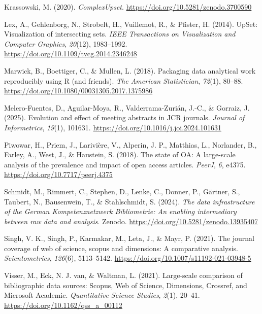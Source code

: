 \documentclass[a4paper,man,floatsintext,longtable,noextraspace,10pt]{apa6}
\newlength{\cslhangindent}
\newenvironment{CSLReferences}[2] %
{\begin{list}{}{%
  \setlength{\itemindent}{0pt}
  \setlength{\leftmargin}{0pt}
  \setlength{\parsep}{0pt}
  \ifodd #1
  \setlength{\leftmargin}{\cslhangindent}
  \setlength{\itemindent}{-1\cslhangindent}
  \fi
  \setlength{\itemsep}{#2\baselineskip}}}
{\end{list}}
\begin{document}
\begin{CSLReferences}{1}{0}
Krassowski, M. (2020). \emph{ComplexUpset}.
\url{https://doi.org/10.5281/zenodo.3700590}

Lex, A., Gehlenborg, N., Strobelt, H., Vuillemot, R., \& Pfister, H.
(2014). UpSet: Visualization of intersecting sets. \emph{IEEE
Transactions on Visualization and Computer Graphics}, \emph{20}(12),
1983--1992. \url{https://doi.org/10.1109/tvcg.2014.2346248}

Marwick, B., Boettiger, C., \& Mullen, L. (2018). Packaging data
analytical work reproducibly using {R} (and friends). \emph{The American
Statistician}, \emph{72}(1), 80--88.
\url{https://doi.org/10.1080/00031305.2017.1375986}

Melero-Fuentes, D., Aguilar-Moya, R., Valderrama-Zurián, J.-C., \&
Gorraiz, J. (2025). Evolution and effect of meeting abstracts in JCR
journals. \emph{Journal of Informetrics}, \emph{19}(1), 101631.
\url{https://doi.org/10.1016/j.joi.2024.101631}

Piwowar, H., Priem, J., Larivière, V., Alperin, J. P., Matthias, L.,
Norlander, B., Farley, A., West, J., \& Haustein, S. (2018). The state
of {OA}: A large-scale analysis of the prevalence and impact of open
access articles. \emph{{PeerJ}}, \emph{6}, e4375.
\url{https://doi.org/10.7717/peerj.4375}

Schmidt, M., Rimmert, C., Stephen, D., Lenke, C., Donner, P., Gärtner,
S., Taubert, N., Bausenwein, T., \& Stahlschmidt, S. (2024). \emph{The
data infrastructure of the {German Kompetenznetzwerk Bibliometrie}: An
enabling intermediary between raw data and analysis}. Zenodo.
\url{https://doi.org/10.5281/zenodo.13935407}

Singh, V. K., Singh, P., Karmakar, M., Leta, J., \& Mayr, P. (2021). The
journal coverage of web of science, scopus and dimensions: A comparative
analysis. \emph{Scientometrics}, \emph{126}(6), 5113--5142.
\url{https://doi.org/10.1007/s11192-021-03948-5}

Visser, M., Eck, N. J. van, \& Waltman, L. (2021). Large-scale
comparison of bibliographic data sources: {Scopus, Web of Science,
Dimensions, Crossref, and Microsoft Academic}. \emph{Quantitative
Science Studies}, \emph{2}(1), 20--41.
\url{https://doi.org/10.1162/qss_a_00112}

\end{CSLReferences}
\end{document}
